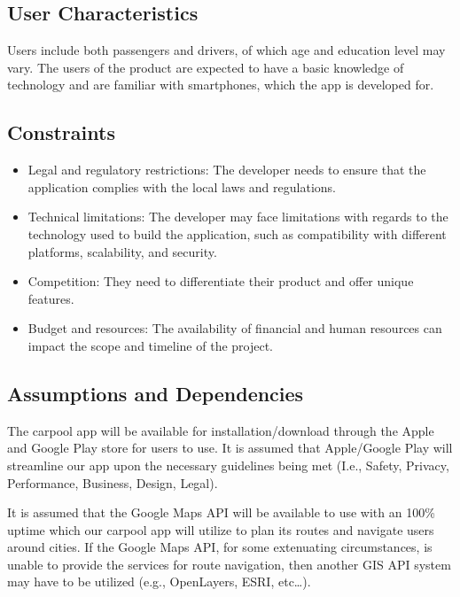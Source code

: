 \documentclass[]{article}
\begin{document}
\subsection{User Characteristics}
\label{sub:user_characteristics}
Users include both passengers and drivers, of which age and education level may vary. The users of the product are expected to have a basic knowledge of technology and are familiar with smartphones, which the app is developed for.	 

\subsection{Constraints}
\label{sub:constraints}
\begin{itemize}
	\item Legal and regulatory restrictions: The developer needs to ensure that the application complies with the local laws and regulations.
	\item Technical limitations: The developer may face limitations with regards to the technology used to build the application, such as compatibility with different platforms, scalability, and security.
	\item Competition: They need to differentiate their product and offer unique features.
	\item Budget and resources: The availability of financial and human resources can impact the scope and timeline of the project.
\end{itemize}

\subsection{Assumptions and Dependencies}
\label{sub:assumptions_and_dependencies}
The carpool app will be available for installation/download through the Apple and Google Play store for users to use. It is assumed that Apple/Google Play will streamline our app upon the necessary guidelines being met (I.e., Safety, Privacy, Performance, Business, Design, Legal).

It is assumed that the Google Maps API will be available to use with an 100\% uptime which our carpool app will utilize to plan its routes and navigate users around cities. If the Google Maps API, for some extenuating circumstances, is unable to provide the services for route navigation, then another GIS API system may have to be utilized (e.g., OpenLayers, ESRI, etc…).
\end{document}
